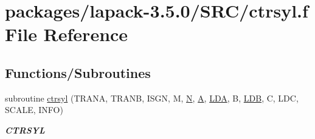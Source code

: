 \hypertarget{ctrsyl_8f}{}\section{packages/lapack-\/3.5.0/\+S\+R\+C/ctrsyl.f File Reference}
\label{ctrsyl_8f}
\subsection*{Functions/\+Subroutines}
\begin{DoxyCompactItemize}
\item 
subroutine \hyperlink{group__complexSYcomputational_ga0da0534f2f1e9be1670bf62a60274a8c}{ctrsyl} (T\+R\+A\+N\+A, T\+R\+A\+N\+B, I\+S\+G\+N, M, \hyperlink{polmisc_8c_a0240ac851181b84ac374872dc5434ee4}{N}, \hyperlink{classA}{A}, \hyperlink{example__user_8c_ae946da542ce0db94dced19b2ecefd1aa}{L\+D\+A}, B, \hyperlink{example__user_8c_a50e90a7104df172b5a89a06c47fcca04}{L\+D\+B}, C, L\+D\+C, S\+C\+A\+L\+E, I\+N\+F\+O)
\begin{DoxyCompactList}\small\item\em {\bfseries C\+T\+R\+S\+Y\+L} \end{DoxyCompactList}\end{DoxyCompactItemize}

